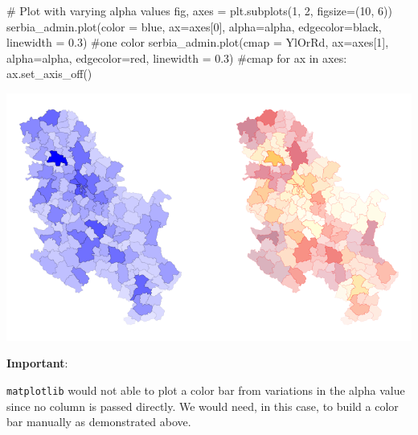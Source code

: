 \documentclass[
  letterpaper,
  DIV=11,
  numbers=noendperiod]{scrreprt}
\newenvironment{Shaded}{\begin{snugshade}}{\end{snugshade}}
\newcommand{\CommentTok}[1]{\textcolor[rgb]{0.37,0.37,0.37}{#1}}
\newcommand{\ControlFlowTok}[1]{\textcolor[rgb]{0.00,0.23,0.31}{#1}}
\newcommand{\DecValTok}[1]{\textcolor[rgb]{0.68,0.00,0.00}{#1}}
\newcommand{\FloatTok}[1]{\textcolor[rgb]{0.68,0.00,0.00}{#1}}
\newcommand{\KeywordTok}[1]{\textcolor[rgb]{0.00,0.23,0.31}{#1}}
\newcommand{\NormalTok}[1]{\textcolor[rgb]{0.00,0.23,0.31}{#1}}
\newcommand{\OperatorTok}[1]{\textcolor[rgb]{0.37,0.37,0.37}{#1}}
\newcommand{\StringTok}[1]{\textcolor[rgb]{0.13,0.47,0.30}{#1}}
\begin{document}
\begin{Shaded}
\begin{Highlighting}[]
\CommentTok{\# Plot with varying alpha values}
\NormalTok{fig, axes }\OperatorTok{=}\NormalTok{ plt.subplots(}\DecValTok{1}\NormalTok{, }\DecValTok{2}\NormalTok{, figsize}\OperatorTok{=}\NormalTok{(}\DecValTok{10}\NormalTok{, }\DecValTok{6}\NormalTok{))}
\NormalTok{serbia\_admin.plot(color }\OperatorTok{=} \StringTok{\textquotesingle{}blue\textquotesingle{}}\NormalTok{, ax}\OperatorTok{=}\NormalTok{axes[}\DecValTok{0}\NormalTok{], alpha}\OperatorTok{=}\NormalTok{alpha, edgecolor}\OperatorTok{=}\StringTok{\textquotesingle{}black\textquotesingle{}}\NormalTok{, linewidth }\OperatorTok{=} \FloatTok{0.3}\NormalTok{) }\CommentTok{\#one color}
\NormalTok{serbia\_admin.plot(cmap }\OperatorTok{=} \StringTok{\textquotesingle{}YlOrRd\textquotesingle{}}\NormalTok{, ax}\OperatorTok{=}\NormalTok{axes[}\DecValTok{1}\NormalTok{], alpha}\OperatorTok{=}\NormalTok{alpha, edgecolor}\OperatorTok{=}\StringTok{\textquotesingle{}red\textquotesingle{}}\NormalTok{, linewidth }\OperatorTok{=} \FloatTok{0.3}\NormalTok{) }\CommentTok{\#cmap}
\ControlFlowTok{for}\NormalTok{ ax }\KeywordTok{in}\NormalTok{ axes:}
\NormalTok{    ax.set\_axis\_off()}
\end{Highlighting}
\end{Shaded}

\includegraphics{labs/w02_maps_files/figure-pdf/cell-41-output-1.png}

\textbf{Important}:

\texttt{matplotlib} would not able to plot a color bar from variations
in the alpha value since no column is passed directly. We would need, in
this case, to build a color bar manually as demonstrated above.
\end{document}
